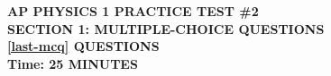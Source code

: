 \documentclass[12pt]{exam}
\begin{document}
\begin{center}
  \textbf{AP PHYSICS 1 PRACTICE TEST \#2\\
    SECTION 1: MULTIPLE-CHOICE QUESTIONS\\
    \ref{last-mcq} QUESTIONS\\
    Time: 25 MINUTES
  }
\end{center}


\vspace{.3in}
\begin{center}
\end{center}
\end{document}
